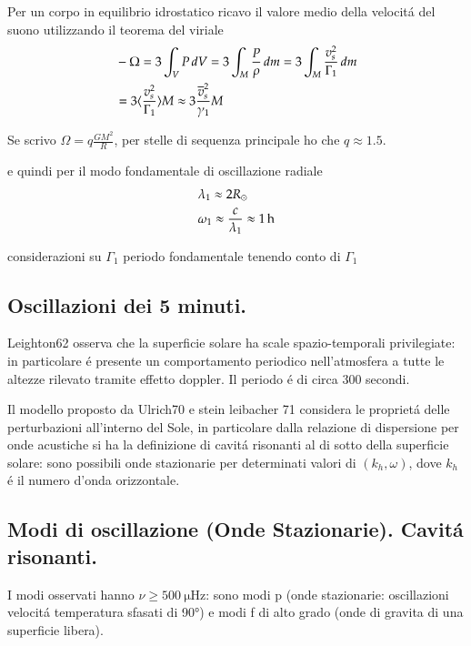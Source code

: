 Per un corpo in equilibrio idrostatico ricavo il valore medio della velocit\'a del suono utilizzando il teorema del viriale
\begin{align*}
    &-\Omega=3\int_VP\,dV=3\int_M\frac{P}{\rho}\,dm=3\int_M\frac{v_s^2}{\Gamma_1}\,dm\\
    &=3\langle \frac{v_s^2}{\Gamma_1} \rangle M\approx3\frac{\overline{v}_s^2}{\gamma_1}M
\end{align*}

Se scrivo $\Omega=q\frac{GM^2}{R}$, per stelle di sequenza principale ho che $q\approx1.5$.

e quindi per il modo fondamentale di oscillazione radiale
\begin{align*}
    &\lambda_1\approx 2R_{\odot}{}\\
    &\omega_1\approx\frac{c}{\lambda_1}\approx\SI{1}{\hour}
\end{align*}

\begin{todo}{considerazioni su $\Gamma_1$}
periodo fondamentale tenendo conto di $\Gamma_1$ 
\end{todo}

\subsection{Oscillazioni dei 5 minuti.}

Leighton62 osserva che la superficie solare ha scale spazio-temporali privilegiate: in particolare \'e presente un comportamento periodico nell'atmosfera a tutte le altezze rilevato tramite effetto doppler. Il periodo \'e di circa 300 secondi.

Il modello proposto da Ulrich70 e stein leibacher 71 considera le propriet\'a delle perturbazioni all'interno del Sole, in particolare dalla relazione di dispersione per onde acustiche si ha la definizione di cavit\'a risonanti al di sotto della superficie solare: sono possibili onde stazionarie per determinati valori di  $(k_h,\omega)$, dove $k_h$ \'e il numero d'onda orizzontale.

\subsection{Modi di oscillazione (Onde Stazionarie). Cavit\'a risonanti.}

I modi osservati hanno $\nu\geq\SI{500}{\micro\hertz}$: sono modi p (onde stazionarie: oscillazioni velocit\'a temperatura sfasati di \ang{90}) e modi f di alto grado (onde di gravita di una superficie libera).

